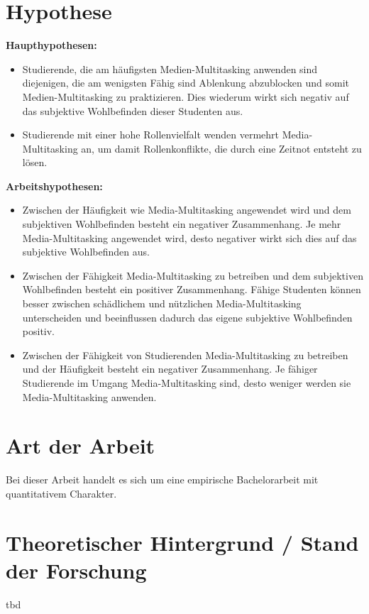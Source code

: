 \section*{Hypothese}\label{section.hypothesen}
\textbf{Haupthypothesen:}
\begin{itemize}
    \item Studierende, die am häufigsten Medien-Multitasking anwenden sind diejenigen, die am wenigsten Fähig sind Ablenkung abzublocken und somit Medien-Multitasking zu praktizieren. Dies wiederum wirkt sich negativ auf das subjektive Wohlbefinden dieser Studenten aus. 
     \item Studierende mit einer hohe Rollenvielfalt wenden vermehrt Media-Multitasking an, um damit Rollenkonflikte, die durch eine Zeitnot entsteht zu lösen.
\end{itemize}
\textbf{Arbeitshypothesen:}
\begin{itemize}
    \item Zwischen der Häufigkeit wie Media-Multitasking angewendet wird und dem subjektiven Wohlbefinden besteht ein negativer Zusammenhang. Je mehr Media-Multitasking angewendet wird, desto negativer wirkt sich dies auf das subjektive Wohlbefinden aus.
    \item Zwischen der Fähigkeit Media-Multitasking zu betreiben und dem subjektiven Wohlbefinden besteht ein positiver Zusammenhang. Fähige Studenten können besser zwischen schädlichem und nützlichen Media-Multitasking unterscheiden und beeinflussen dadurch das eigene subjektive Wohlbefinden positiv.
    \item Zwischen der Fähigkeit von Studierenden Media-Multitasking zu betreiben und der Häufigkeit besteht ein negativer Zusammenhang. Je fähiger Studierende im Umgang Media-Multitasking sind, desto weniger werden sie Media-Multitasking anwenden.
\end{itemize}
\section*{Art der Arbeit}\label{section.artArbeit}
Bei dieser Arbeit handelt es sich um eine empirische Bachelorarbeit mit quantitativem Charakter. 
\section*{Theoretischer Hintergrund / Stand der Forschung}\label{section.forschung}
tbd
